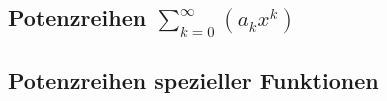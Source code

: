 
\subsection{Potenzreihen $ \sum_{k=0}^\infty \left( a_k x^k \right) $}
\label{sec:potenzreihen}


\subsection{Potenzreihen spezieller Funktionen}

